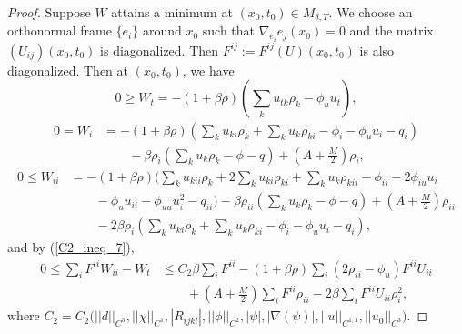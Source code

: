 \documentclass[12pt]{amsart}
\theoremstyle{definition}
\theoremstyle{remark}
\numberwithin{equation}{section}
\begin{document}
\begin{proof}
	Suppose $W$ attains a minimum at $(x_0, t_0) \in M_{\delta, T}$. 
	We choose an orthonormal frame $\{e_i\}$ around $x_0$ such that $\nabla_{e_i} e_j (x_0) = 0$ and the matrix $\left( U_{ij} \right)(x_0, t_0)$ is diagonalized. Then $F^{ij} := F^{ij}(U)(x_0, t_0)$ is also diagonalized. Then at $(x_0, t_0)$, we have
	\begin{equation}\label{C2_nn_1}
	0 \geq W_t = - (1 + \beta\rho) (\sum_k u_{tk} \rho_k - \phi_{u} u_t),
	\end{equation}
	\begin{equation}\label{C2_nn_2}
	\begin{aligned}
	0 = W_i &= - (1 + \beta\rho) \left(\sum_k u_{ki} \rho_k + \sum_k u_{k} \rho_{ki} - \phi_{i} - \phi_{u} u_{i} - q_{i} \right) \\
	&\qquad - \beta \rho_{i} (\sum_{k} u_{k}\rho_{k} - \phi - q) + (A + \frac{M}{2}) \rho_{i},
	\end{aligned}
	\end{equation}
	\begin{equation}\label{C2_nn_3}
	\begin{aligned}
	0 \leq W_{ii} &= - (1 + \beta\rho) \Bigg(\sum_k u_{kii} \rho_k + 2\sum_k u_{ki} \rho_{ki} + \sum_k u_{k} \rho_{kii} - \phi_{ii} - 2 \phi_{iu} u_{i}\\
	& \qquad - \phi_{u} u_{ii} - \phi_{uu} u_{i}^2 - q_{ii} \Bigg) 
	- \beta \rho_{ii} (\sum_{k} u_{k}\rho_{k} - \phi - q) + (A + \frac{M}{2}) \rho_{ii}\\
	&\qquad - 2 \beta\rho_{i} \left(\sum_k u_{ki} \rho_k + \sum_k u_{k} \rho_{ki} - \phi_{i} - \phi_{u} u_{i} - q_{i} \right),
	\end{aligned}
	\end{equation}
	and by (\ref{C2_ineq_7}),
	\begin{equation}\label{C2_nn_4}
	\begin{aligned}
	0 \leq \sum_i F^{ii} W_{ii} - W_t
	&\leq C_2 \beta \sum_i F^{ii} - (1 + \beta\rho) \sum_i ( 2\rho_{ii} - \phi_{u}) F^{ii} U_{ii}  \\
	&\qquad + (A + \frac{M}{2}) \sum_i F^{ii} \rho_{ii} - 2 \beta \sum_i F^{ii} U_{ii} \rho_i^2 ,
	\end{aligned}
	\end{equation}
	where $C_2 = C_2 \big(||d||_{C^3}, ||\chi||_{C^1}, |R_{ijkl}|, ||\phi||_{C^2}, |\psi|, |\nabla(\psi)|, || u||_{C^{1, 1}}, ||u_0||_{C^3} \big)$.
	

\end{proof}
\end{document}
